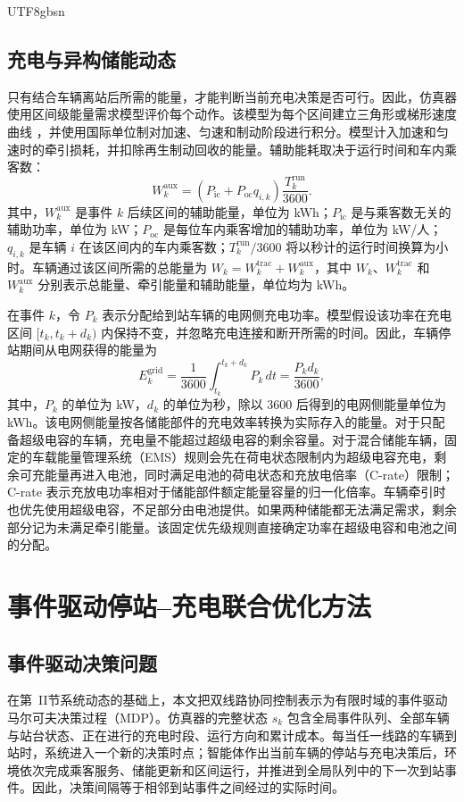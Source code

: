 \documentclass[conference]{IEEEtran}
\begin{document}
\begin{CJK*}{UTF8}{gbsn}
\subsection{充电与异构储能动态}
只有结合车辆离站后所需的能量，才能判断当前充电决策是否可行。因此，仿真器使用区间级能量需求模型评价每个动作。该模型为每个区间建立三角形或梯形速度曲线 \cite{ghaviha2019speed}，并使用国际单位制对加速、匀速和制动阶段进行积分。模型计入加速和匀速时的牵引损耗，并扣除再生制动回收的能量。辅助能耗取决于运行时间和车内乘客数：
\begin{equation}
    W^{\mathrm{aux}}_k = \left(P_{\mathrm{ic}} + P_{\mathrm{oc}} q_{i,k}\right)\frac{T^{\mathrm{run}}_k}{3600}.
\end{equation}
其中，$W^{\mathrm{aux}}_k$ 是事件 $k$ 后续区间的辅助能量，单位为 kWh；$P_{\mathrm{ic}}$ 是与乘客数无关的辅助功率，单位为 kW；$P_{\mathrm{oc}}$ 是每位车内乘客增加的辅助功率，单位为 kW/人；$q_{i,k}$ 是车辆 $i$ 在该区间内的车内乘客数；$T^{\mathrm{run}}_k/3600$ 将以秒计的运行时间换算为小时。车辆通过该区间所需的总能量为 $W_k = W^{\mathrm{trac}}_k + W^{\mathrm{aux}}_k$，其中 $W_k$、$W^{\mathrm{trac}}_k$ 和 $W^{\mathrm{aux}}_k$ 分别表示总能量、牵引能量和辅助能量，单位均为 kWh。

在事件 $k$，令 $P_k$ 表示分配给到站车辆的电网侧充电功率。模型假设该功率在充电区间 $[t_k,t_k+d_k)$ 内保持不变，并忽略充电连接和断开所需的时间。因此，车辆停站期间从电网获得的能量为
\begin{equation}
 E^{\mathrm{grid}}_k
 =\frac{1}{3600}\int_{t_k}^{t_k+d_k}P_k\,dt
 =\frac{P_kd_k}{3600},
\end{equation}
其中，$P_k$ 的单位为 kW，$d_k$ 的单位为秒，除以 3600 后得到的电网侧能量单位为 kWh。该电网侧能量按各储能部件的充电效率转换为实际存入的能量。对于只配备超级电容的车辆，充电量不能超过超级电容的剩余容量。对于混合储能车辆，固定的车载能量管理系统（EMS）规则会先在荷电状态限制内为超级电容充电，剩余可充能量再进入电池，同时满足电池的荷电状态和充放电倍率（C-rate）限制；C-rate 表示充放电功率相对于储能部件额定能量容量的归一化倍率。车辆牵引时也优先使用超级电容，不足部分由电池提供。如果两种储能都无法满足需求，剩余部分记为未满足牵引能量。该固定优先级规则直接确定功率在超级电容和电池之间的分配。

\section{事件驱动停站--充电联合优化方法}
\subsection{事件驱动决策问题}
在第~II节系统动态的基础上，本文把双线路协同控制表示为有限时域的事件驱动马尔可夫决策过程（MDP）。仿真器的完整状态 $s_k$ 包含全局事件队列、全部车辆与站台状态、正在进行的充电时段、运行方向和累计成本。每当任一线路的车辆到站时，系统进入一个新的决策时点；智能体作出当前车辆的停站与充电决策后，环境依次完成乘客服务、储能更新和区间运行，并推进到全局队列中的下一次到站事件。因此，决策间隔等于相邻到站事件之间经过的实际时间。


\end{CJK*}
\end{document}

